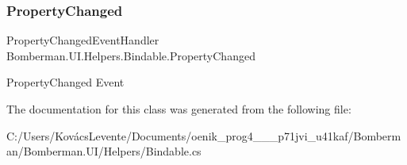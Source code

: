 \subsubsection{\texorpdfstring{PropertyChanged}{PropertyChanged}}
{\footnotesize\ttfamily Property\+Changed\+Event\+Handler Bomberman.\+U\+I.\+Helpers.\+Bindable.\+Property\+Changed}



Property\+Changed Event 



The documentation for this class was generated from the following file\+:\begin{DoxyCompactItemize}
\item 
C\+:/\+Users/\+Kovács\+Levente/\+Documents/oenik\+\_\+prog4\+\_\+\_\+\_\+p71jvi\+\_\+u41kaf/\+Bomberman/\+Bomberman.\+U\+I/\+Helpers/Bindable.\+cs\end{DoxyCompactItemize}
